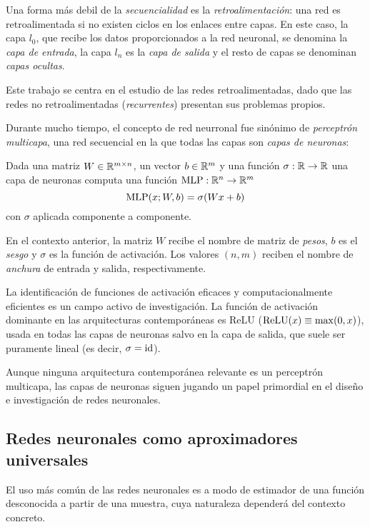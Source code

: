 Una forma más debil de la \textit{secuencialidad} es la \textit{retroalimentación}: una red es retroalimentada si no existen ciclos en los enlaces entre capas. En este caso, la capa \( l_0 \), que recibe los datos proporcionados a la red neuronal, se denomina la \textit{capa de entrada}, la capa \( l_{n} \) es la \textit{capa de salida} y el resto de capas se denominan \textit{capas ocultas}.

Este trabajo se centra en el estudio de las redes retroalimentadas, dado que las redes no retroalimentadas (\textit{recurrentes}) presentan sus problemas propios.

Durante mucho tiempo, el concepto de red neurronal fue sinónimo de \textit{perceptrón multicapa}, una red secuencial en la que todas las capas son \textit{capas de neuronas}:
\begin{definition}
    Dada una matriz \( W \in \mathbb{R}^{m \times n} \), un vector \( b \in \mathbb{R}^{m} \) y una función \( \sigma: \mathbb{R} \to \mathbb{R} \) una capa de neuronas computa una función \( \operatorname{MLP}: \mathbb{R}^{n} \to \mathbb{R}^{m} \)
    \[
        \operatorname{MLP}(x; W, b) = \sigma(Wx + b)
    \]
    con \( \sigma \) aplicada componente a componente.

    En el contexto anterior, la matriz \( W \) recibe el nombre de matriz de \textit{pesos}, \( b \) es el \textit{sesgo} y \( \sigma \) es la función de activación. Los valores \( (n, m) \) reciben el nombre de \textit{anchura} de entrada y salida, respectivamente.
\end{definition}

La identificación de funciones de activación eficaces y computacionalmente eficientes es un campo activo de investigación. La función de activación dominante en las arquitecturas contemporáneas es ReLU (\( \operatorname{ReLU}(x) \equiv \max(0, x) \)), usada en todas las capas de neuronas salvo en la capa de salida, que suele ser puramente lineal (es decir, \( \sigma = \operatorname{id} \)).

Aunque ninguna arquitectura contemporánea relevante es un perceptrón multicapa, las capas de neuronas siguen jugando un papel primordial en el diseño e investigación de redes neuronales.

\subsection{Redes neuronales como aproximadores universales}    
El uso más común de las redes neuronales es a modo de estimador de una función desconocida a partir de una muestra, cuya naturaleza dependerá del contexto concreto.

